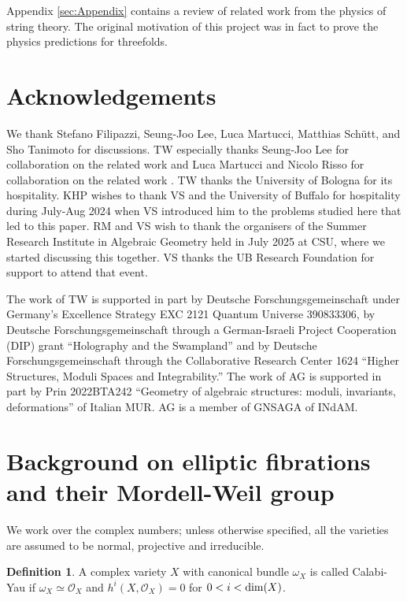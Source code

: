 \documentclass[11pt]{amsart}
\theoremstyle{definition}
\newtheorem{definition}[theorem]{Definition}
\theoremstyle{definition}
\theoremstyle{remark}
\theoremstyle{remark}
\theoremstyle{definition}
\theoremstyle{conjecture}
\begin{document}
Appendix \ref{sec:Appendix} contains a review of related work from the physics of string theory. The original motivation of this project was  in fact to prove the physics predictions for threefolds.

\color{black}


\section*{Acknowledgements}
We thank Stefano Filipazzi, Seung-Joo Lee, Luca Martucci, Matthias Schütt, and  Sho Tanimoto for discussions. 
TW especially thanks Seung-Joo Lee for collaboration on the related work \cite{Lee:2018ihr, Lee:2019skh} and Luca Martucci and Nicolo Risso for collaboration on the related work \cite{Martucci:2022krl}.
TW thanks the University of Bologna for its hospitality. KHP wishes to thank VS and the University of Buffalo for hospitality during July-Aug 2024 when VS introduced him to the problems studied here that led to this paper.
RM and VS wish to thank the organisers of the Summer Research Institute in Algebraic Geometry held in July 2025 at CSU, where we started discussing this together. 
VS thanks the UB Research Foundation for support to attend that event.

The work of TW is supported in part by Deutsche Forschungsgemeinschaft under Germany's Excellence Strategy EXC 2121 Quantum Universe 390833306, by Deutsche Forschungsgemeinschaft through a German-Israeli Project Cooperation (DIP) grant ``Holography and the Swampland'' and by Deutsche Forschungsgemeinschaft through the Collaborative Research Center 1624 ``Higher Structures, Moduli Spaces and Integrability.'' 
The work of AG is supported in part by 
Prin 2022BTA242 ``Geometry of algebraic structures: moduli, invariants, deformations'' of Italian MUR. AG is a member of GNSAGA of  INdAM. 


\section{Background on elliptic fibrations and their Mordell-Weil group} \label{sec:Background}
 We work over the complex numbers; {unless otherwise specified, all the varieties are assumed to be normal, projective and irreducible}.

\begin{definition} \label{def-CY}
    A complex variety $X$ with canonical bundle $\omega_X$ is called Calabi-Yau if $\omega_X \simeq {\mathcal O}_X$ and $h^{i}(X,{\mathcal{O} }_X) =0$ for $0<i< {\rm dim}(X)$.
\end{definition}
\end{document}
